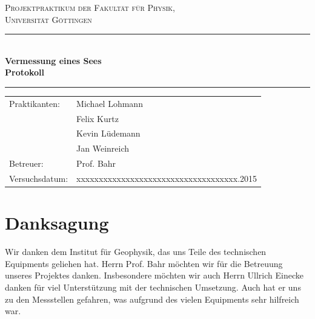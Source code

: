 \documentclass[12pt,a4paper,titlepage,headinclude,bibtotoc]{scrartcl}
\begin{document}
\begin{titlepage}
\centering
\textsc{\Large Projektpraktikum der Fakultät für
  Physik,\\[1ex] Universität Göttingen}

\vspace*{2cm}

\rule{\textwidth}{1pt}\\[0.5cm]
{\huge \bfseries
  Vermessung eines Sees \\[1ex]
  Protokoll}\\[0.5cm]
\rule{\textwidth}{1pt}

\vspace*{2cm}

\begin{Large}
\begin{tabular}{ll}
Praktikanten: &  Michael Lohmann\\
 &  Felix Kurtz\\
 &  Kevin Lüdemann\\
 &  Jan Weinreich\\
 Betreuer: & Prof. Bahr\\
 Versuchsdatum: & xxxxxxxxxxxxxxxxxxxxxxxxxxxxxxxxxxxx.2015\\
\end{tabular}
\end{Large}

\vspace*{3.8cm}

\begin{Large}
\end{Large}

\end{titlepage}

\tableofcontents
\thispagestyle{empty}
\newpage

\section*{Danksagung}
Wir danken dem Institut für Geophysik, das uns Teile des technischen Equipments geliehen hat.
Herrn Prof. Bahr möchten wir für die Betreuung unseres Projektes danken.
Insbesondere möchten wir auch Herrn Ullrich Einecke danken für viel Unterstützung mit der technischen Umsetzung.
Auch hat er uns zu den Messstellen gefahren, was aufgrund des vielen Equipments sehr hilfreich war.
\thispagestyle{empty}
\newpage
\end{document}
